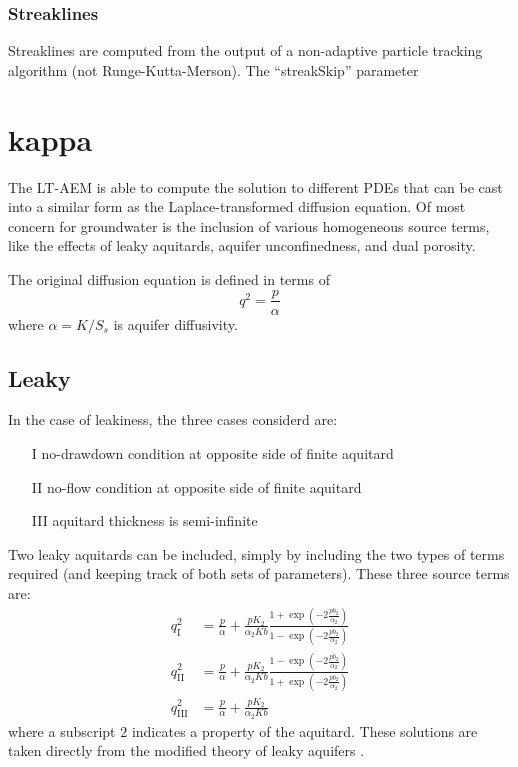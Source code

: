 \documentclass[12pt,letterpaper]{article}
\begin{document}
\subsubsection{Streaklines}
Streaklines are computed from the output of a non-adaptive particle tracking algorithm (not Runge-Kutta-Merson).  The ``streakSkip'' parameter

\section{kappa}
\label{sec:kappa}

The LT-AEM is able to compute the solution to different PDEs that can
be cast into a similar form as the Laplace-transformed diffusion
equation.  Of most concern for groundwater is the inclusion of various
homogeneous source terms, like the effects of leaky aquitards, aquifer
unconfinedness, and dual porosity.

The original diffusion equation is defined in terms of 
\begin{equation}
  \label{eq:1}
  q^2 = \frac{p}{\alpha}
\end{equation}
where $\alpha=K/S_s$ is aquifer diffusivity.  

\subsection{Leaky}
In the case of leakiness, the three cases considerd are:
\begin{enumerate}
\item[I] no-drawdown condition at opposite side of finite aquitard
\item[II] no-flow condition at opposite side of finite aquitard
\item[III] aquitard thickness is semi-infinite
\end{enumerate}
Two leaky aquitards can be included, simply by including the two types
of terms required (and keeping track of both sets of parameters).
These three source terms are:
\begin{align}
  q_{\mathrm{I}}^2 &= \frac{p}{\alpha} + \frac{p K_2}{\alpha_2 Kb} \frac{1 + \exp\left(-2 \frac{p b_2}{\alpha_2}\right)}{1 - \exp\left(-2 \frac{p b_2}{\alpha_2}\right)} \\
  q_{\mathrm{II}}^2 &= \frac{p}{\alpha} + \frac{p K_2}{\alpha_2 Kb} \frac{1 - \exp\left(-2 \frac{p b_2}{\alpha_2}\right)}{1 + \exp\left(-2 \frac{p b_2}{\alpha_2}\right)} \\
  q_{\mathrm{III}}^2 &= \frac{p}{\alpha} + \frac{p K_2}{\alpha_2 Kb} 
\end{align}
where a subscript $2$ indicates a property of the aquitard.  These
solutions are taken directly from the modified theory of leaky
aquifers \cite{hantush1960modification}.
\end{document}
